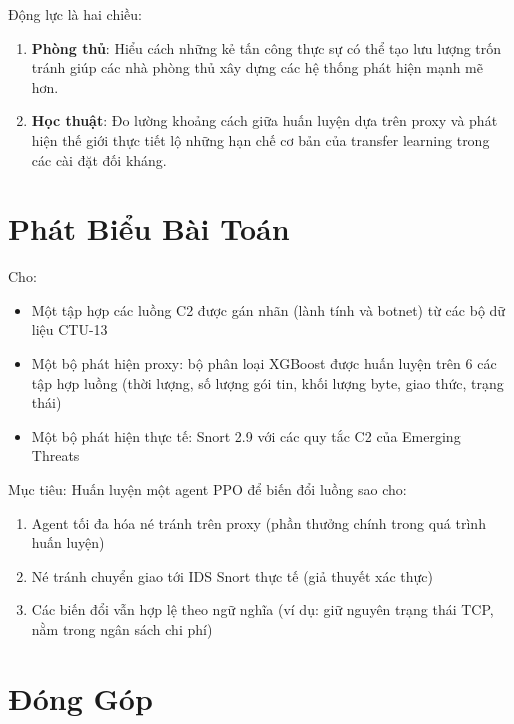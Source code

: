 \documentclass[12pt,a4paper]{report}
\begin{document}
Động lực là hai chiều:
\begin{enumerate}
  \item \textbf{Phòng thủ}: Hiểu cách những kẻ tấn công thực sự có thể tạo lưu lượng trốn tránh giúp các nhà phòng thủ xây dựng các hệ thống phát hiện mạnh mẽ hơn.
  \item \textbf{Học thuật}: Đo lường khoảng cách giữa huấn luyện dựa trên proxy và phát hiện thế giới thực tiết lộ những hạn chế cơ bản của transfer learning trong các cài đặt đối kháng.
\end{enumerate}

\section{Phát Biểu Bài Toán}

Cho:
\begin{itemize}
  \item Một tập hợp các luồng C2 được gán nhãn (lành tính và botnet) từ các bộ dữ liệu CTU-13
  \item Một bộ phát hiện proxy: bộ phân loại XGBoost được huấn luyện trên 6 các tập hợp luồng (thời lượng, số lượng gói tin, khối lượng byte, giao thức, trạng thái)
  \item Một bộ phát hiện thực tế: Snort 2.9 với các quy tắc C2 của Emerging Threats
\end{itemize}

Mục tiêu: Huấn luyện một agent PPO để biến đổi luồng sao cho:
\begin{enumerate}
  \item Agent tối đa hóa né tránh trên proxy (phần thưởng chính trong quá trình huấn luyện)
  \item Né tránh chuyển giao tới IDS Snort thực tế (giả thuyết xác thực)
  \item Các biến đổi vẫn hợp lệ theo ngữ nghĩa (ví dụ: giữ nguyên trạng thái TCP, nằm trong ngân sách chi phí)
\end{enumerate}

\section{Đóng Góp}
\end{document}
